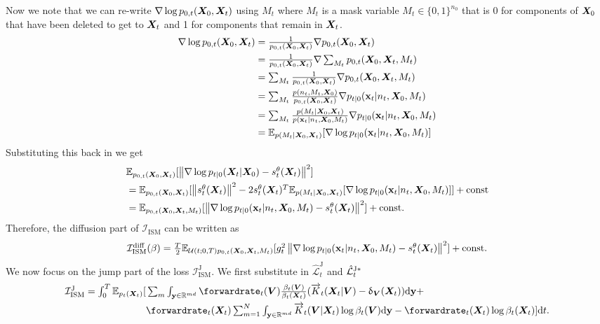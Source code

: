 Now we note that we can re-write $\nabla \log p_{0,t}({\bm{X}}_0, {\bm{X}}_t)$ using $M_t$ where $M_t$ is a mask variable $M_t \in \{0, 1\}^{n_0}$ that is 0 for components of ${\bm{X}}_0$ that have been deleted to get to ${\bm{X}}_t$ and 1 for components that remain in ${\bm{X}}_t$.
\begin{align}
    \nabla \log p_{0,t}({\bm{X}}_0, {\bm{X}}_t) &\textstyle = \frac{1}{p_{0,t}({\bm{X}}_0, {\bm{X}}_t)} \nabla p_{0,t}({\bm{X}}_0, {\bm{X}}_t) \\
    &\textstyle = \frac{1}{p_{0,t}({\bm{X}}_0, {\bm{X}}_t)} \nabla \sum_{M_t} p_{0,t}({\bm{X}}_0, {\bm{X}}_t, M_t)\\
    &\textstyle = \sum_{M_t} \frac{1}{p_{0,t}({\bm{X}}_0, {\bm{X}}_t)} \nabla p_{0,t}({\bm{X}}_0, {\bm{X}}_t, M_t)\\
    &\textstyle = \sum_{M_t} \frac{p(n_t, M_t, {\bm{X}}_0)}{p_{0,t}({\bm{X}}_0, {\bm{X}}_t)} \nabla p_{t|0}({\mathbf{x}}_t | n_t, {\bm{X}}_0, M_t)\\
    &\textstyle = \sum_{M_t} \frac{p(M_t | {\bm{X}}_0, {\bm{X}}_t)}{p({\mathbf{x}}_t | n_t, {\bm{X}}_0, M_t)} \nabla p_{t|0}({\mathbf{x}}_t | n_t, {\bm{X}}_0, M_t)\\
    &\textstyle = \mathbb{E}_{p(M_t | {\bm{X}}_0, {\bm{X}}_t)} [ \nabla \log p_{t|0}({\mathbf{x}}_t | n_t, {\bm{X}}_0, M_t) ]
\end{align}
Substituting this back in we get
\begin{align}
     &\textstyle \mathbb{E}_{p_{0, t}({\bm{X}}_0, {\bm{X}}_t) } [ \left\lVert \nabla \log p_{t|0}({\bm{X}}_t | {\bm{X}}_0) - s_t^\theta({\bm{X}}_t) \right\rVert^2 ] \\
     &\textstyle = \mathbb{E}_{p_{0,t}({\bm{X}}_0, {\bm{X}}_t)} [ \left\lVert s_t^\theta({\bm{X}}_t)\right\rVert^2 - 2 s_t^\theta({\bm{X}}_t)^T \mathbb{E}_{p(M_t | {\bm{X}}_0, {\bm{X}}_t)} [ \nabla \log p_{t|0}({\mathbf{x}}_t | n_t, {\bm{X}}_0, M_t) ] ] + \text{const}\\
     &\textstyle = \mathbb{E}_{p_{0,t}({\bm{X}}_0, {\bm{X}}_t, M_t)} [ \left\lVert\nabla \log p_{t|0}({\mathbf{x}}_t | n_t, {\bm{X}}_0, M_t) - s_t^\theta({\bm{X}}_t) \right\rVert^2 ] + \text{const} . 
\end{align}
Therefore, the diffusion part of $\mathcal{I}_{\text{ISM}}$ can be written as
\begin{equation}
\textstyle     \mathcal{I}_{\text{ISM}}^{\text{diff}}(\beta) = \frac{T}{2} \mathbb{E}_{\mathcal{U}(t; 0, T) p_{0,t}({\bm{X}}_0, {\bm{X}}_t, M_t) } [g_t^2 \left\lVert\nabla \log p_{t|0}({\mathbf{x}}_t | n_t, {\bm{X}}_0, M_t) - s_t^\theta({\bm{X}}_t)\right\rVert^2 ] + \text{const} . 
\end{equation}
We now focus on the jump part of the loss $\mathcal{I}_{\text{ISM}}^{\text{J}}$. We first substitute in $\hat{\mathcal{L}}^{\text{J}}_t$ and $\hat{\mathcal{L}}^{\text{J}* }_t$
\begin{align}
    \textstyle \mathcal{I}_{\text{ISM}}^{\text{J}} = \int_0^T \mathbb{E}_{p_t(\mX_t)} [&\textstyle  \sum_m \int_{\y \in \mathbb{R}^{md}} \forwardrate_t(\mV) \frac{\beta_t(\mV)}{\beta_t(\mX_t)} ( \ftk_t(\mX_t | \mV) - \updelta_{\mV} (\mX_t) ) \rmd\y + \\
    &\textstyle \forwardrate_t(\mX_t) \inty \ftk_t(\mV | \mX_t) \log \beta_t(\mV) \rmd\y - \forwardrate_t(\mX_t) \log \beta_t(\mX_t)] \rmd t. \label{eq:def_ism_j}
\end{align}
